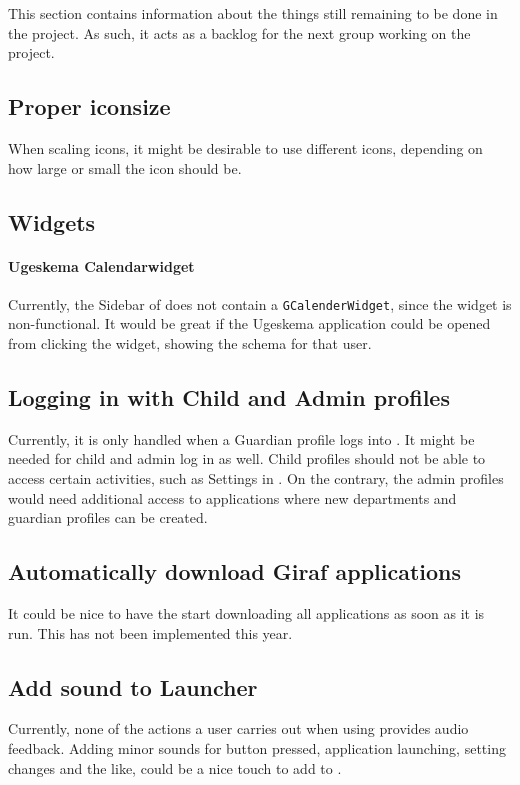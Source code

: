 This section contains information about the things still remaining to be done in the \launcher project.
As such, it acts as a backlog for the next group working on the project.

\subsection{Proper iconsize}
When scaling icons, it might be desirable to use different icons, depending on how large or small the icon should be.

\subsection{Widgets}

\paragraph{Ugeskema Calendarwidget}
Currently, the Sidebar of \launcher does not contain a \lstinline!GCalenderWidget!, since the widget is non-functional.
It would be great if the Ugeskema application could be opened from clicking the widget, showing the schema for that user.

\subsection{Logging in with Child and Admin profiles}
Currently, it is only handled when a Guardian profile logs into \launcher.
It might be needed for child and admin log in as well.
Child profiles should not be able to access certain activities, such as Settings in \launcher.
On the contrary, the admin profiles would need additional access to applications where new departments and guardian profiles can be created.

\subsection{Automatically download Giraf applications}
It could be nice to have the \launcher start downloading all \giraf applications as soon as it is run.
This has not been implemented this year.

\subsection{Add sound to Launcher}
Currently, none of the actions a user carries out when using \launcher provides audio feedback.
Adding minor sounds for button pressed, application launching, setting changes and the like, could be a nice touch to add to \launcher. 

